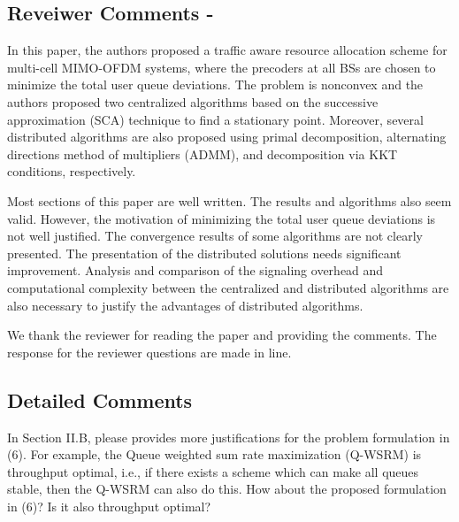 
\subsection{Reveiwer Comments - }

In this paper, the authors proposed a traffic aware resource allocation scheme for multi-cell MIMO-OFDM systems, where the precoders at all BSs are chosen to minimize the total user queue deviations. The problem is nonconvex and the authors proposed two centralized algorithms based on the successive approximation (SCA) technique to find a stationary point. Moreover, several distributed algorithms are also proposed using primal decomposition, alternating directions method of multipliers (ADMM), and decomposition via KKT conditions, respectively.

Most sections of this paper are well written. The results and algorithms also seem valid. However, the motivation of minimizing the total user queue deviations is not well justified. The convergence results of some algorithms are not clearly presented. The presentation of the distributed solutions needs significant improvement. Analysis and comparison of the signaling overhead and computational complexity between the centralized and distributed algorithms are also necessary to justify the advantages of distributed algorithms.

\resp We thank the reviewer for reading the paper and providing the comments. The response for the reviewer questions are made in line.

\subsection*{Detailed Comments}  
 In Section II.B, please provides more justifications for the problem formulation in (6). For example, the Queue weighted sum rate maximization (Q-WSRM) is throughput optimal, i.e., if there exists a scheme which can make all queues stable, then the Q-WSRM can also do this. How about the proposed formulation in (6)? Is it also throughput optimal? 


